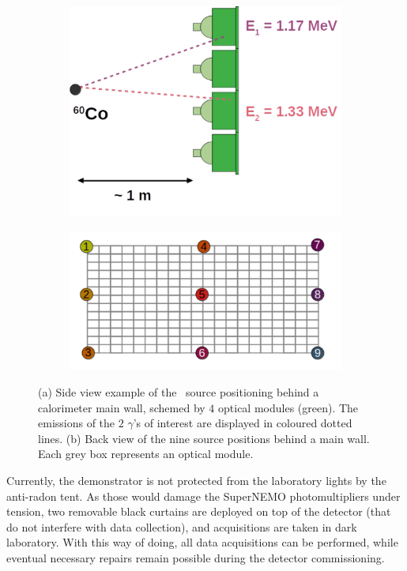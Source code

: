 \begin{figure}[h]
  \centering
  \begin{subfigure}[t]{0.48\textwidth}
    \centering
    \includegraphics[height=0.5\textwidth]{commissioning/fig_commissioning/Co_setup.pdf}
    \captionsetup{justification=justified}
    \caption{
      \label{subfig:Co_setup}}
  \end{subfigure}
  \hfill
  \begin{subfigure}[t]{0.48\textwidth}
    \centering
    \includegraphics[height=0.5\textwidth]{commissioning/fig_commissioning/Co_setup_wall.pdf}
    \captionsetup{justification=justified}
    \caption{
      \label{subfig:Co_setup_wall}}
  \end{subfigure}
  \caption{(a) Side view example of the \Co\ source positioning behind a calorimeter main wall, schemed by $4$ optical modules (green).
    The emissions of the $2$ $\gamma$'s of interest are displayed in coloured dotted lines.
    (b) Back view of the nine source positions behind a main wall.
    Each grey box represents an optical module.
    \label{fig:Co_exp_design}
  }
\end{figure}

Currently, the demonstrator is not protected from the laboratory lights by the anti-radon tent.
As those would damage the SuperNEMO photomultipliers under tension, two removable black curtains are deployed on top of the detector (that do not interfere with data collection), and acquisitions are taken in dark laboratory.
With this way of doing, all data acquisitions can be performed, while eventual necessary repairs remain possible during the detector commissioning.

